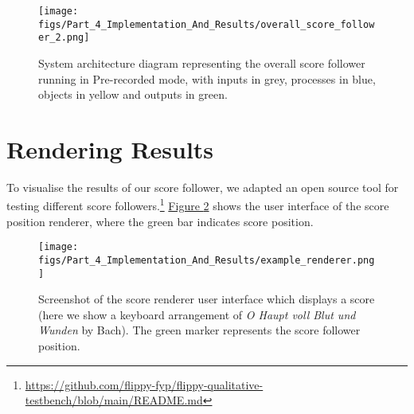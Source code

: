 \begin{figure}[H]
    \centering
    \texttt{[image: figs/Part\_4\_Implementation\_And\_Results/overall\_score\_follower\_2.png]}
    \caption{System architecture diagram representing the overall score follower running in Pre-recorded mode, with inputs in grey, processes in blue, objects in yellow and outputs in green.}
    \label{fig:overall_system_architecture}
\end{figure}


\section{Rendering Results}{\label{section:renderer}}
To visualise the results of our score follower, we adapted an open source tool for testing different score followers.\footnote{\href{https://github.com/flippy-fyp/flippy-qualitative-testbench/blob/main/README.md}{https://github.com/flippy-fyp/flippy-qualitative-testbench/blob/main/README.md}} \hyperref[fig:flippy_example]{Figure \ref*{fig:flippy_example}} shows the user interface of the score position renderer, where the green bar indicates score position. 

\begin{figure}[H]
    \centering
    \texttt{[image: figs/Part\_4\_Implementation\_And\_Results/example\_renderer.png]}
    \caption{Screenshot of the score renderer user interface which displays a score (here we show a keyboard arrangement of \textit{O Haupt voll Blut und Wunden} by Bach). The green marker represents the score follower position.}
    \label{fig:flippy_example}
\end{figure}


